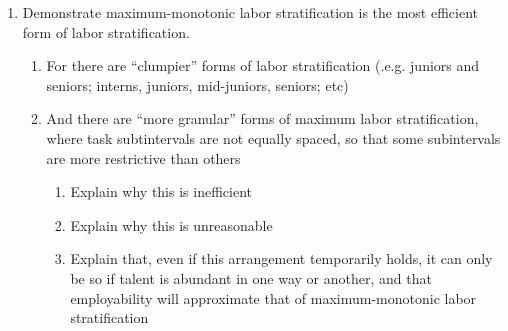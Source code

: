 \documentclass[hidelinks, nonatbib]{elsarticle}
\begin{document}
\begin{enumerate}
    \item Demonstrate maximum-monotonic labor stratification is the most efficient form of labor stratification.
    \begin{enumerate}
        \item For there are ``clumpier'' forms of labor stratification (.e.g. juniors and seniors; interns, juniors, mid-juniors, seniors; etc)
        \item And there are ``more granular'' forms of maximum labor stratification, where task subtintervals are not equally spaced, so that some subintervals are more restrictive than others
        \begin{enumerate}
            \item Explain why this is inefficient
            \item Explain why this is unreasonable
            \item Explain that, even if this arrangement temporarily holds, it can only be so if talent is abundant in one way or another, and that employability will approximate that of maximum-monotonic labor stratification
        \end{enumerate}
    \end{enumerate}
\end{enumerate}

\end{document}
